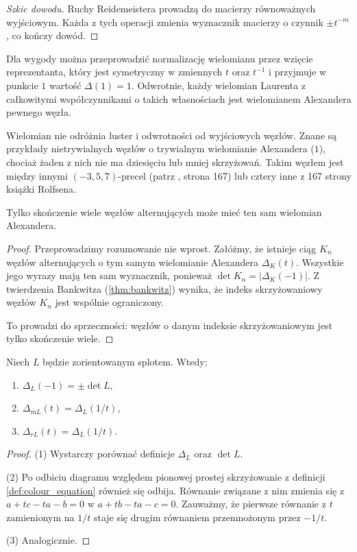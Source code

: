 \begin{proof}[Szkic dowodu]
	Ruchy Reidemeistera prowadzą do macierzy równoważnych wyjściowym.
	Każda z tych operacji zmienia wyznacznik macierzy o czynnik $\pm t^{-m}$, co kończy dowód.
\end{proof}

Dla wygody można przeprowadzić normalizację wielomianu przez wzięcie reprezentanta, który jest symetryczny w zmiennych $t$ oraz $t^{-1}$ i przyjmuje w punkcie $1$ wartość $\Delta(1) = 1$.
Odwrotnie, każdy wielomian Laurenta z całkowitymi współczynnikami o takich własnościach jest wielomianem Alexandera pewnego węzła.

Wielomian nie odróżnia luster i odwrotności od wyjściowych węzłów.
Znane są przykłady nietrywialnych węzłów o trywialnym wielomianie Alexandera ($1$), chociaż żaden z nich nie ma dziesięciu lub mniej skrzyżowań.
Takim węzłem jest między innymi  $(-3, 5, 7)$-precel (patrz \cite{adams94}, strona 167) lub cztery inne z 167 strony książki \cite{rolfsen76} Rolfsena.

\begin{proposition}
	Tylko skończenie wiele węzłów alternujących może mieć ten sam wielomian Alexandera.
\end{proposition}

\begin{proof}
	Przeprowadzimy rozumowanie nie wprost.
	Załóżmy, że istnieje ciąg $K_n$ węzłów alternujących o tym samym wielomianie Alexandera $\Delta_K(t)$.
	Wszystkie jego wyrazy mają ten sam wyznacznik, ponieważ $\det K_n = |\Delta_K(-1)|$.
	Z twierdzenia Bankwitza (\ref{thm:bankwitz}) wynika, że indeks skrzyżowaniowy węzłów $K_n$ jest wspólnie ograniczony.

	To prowadzi do sprzeczności: węzłów o danym indeksie skrzyżowaniowym jest tylko skończenie wiele.
\end{proof}

\begin{proposition}
	Niech $L$ będzie zorientowanym splotem.
	Wtedy:
	\begin{enumerate}
		\item $\Delta_L(-1) = \pm \det L$,
		\item $\Delta_{mL}(t) = \Delta_L(1/t)$,
		\item $\Delta_{rL}(t) = \Delta_L(1/t)$.
	\end{enumerate}
\end{proposition}

\begin{proof}
	(1) Wystarczy porównać definicje $\Delta_L$ oraz $\det L$.

	(2) Po odbiciu diagramu względem pionowej prostej skrzyżowanie z definicji \ref{def:colour_equation} również się odbija.
	Równanie związane z nim zmienia się z $a + tc - ta - b = 0$ w $a + tb - ta - c = 0$.
	Zauważmy, że pierwsze równanie z $t$ zamienionym na $1/t$ staje się drugim równaniem przemnożonym przez $-1/t$.

	(3) Analogicznie.
\end{proof}

